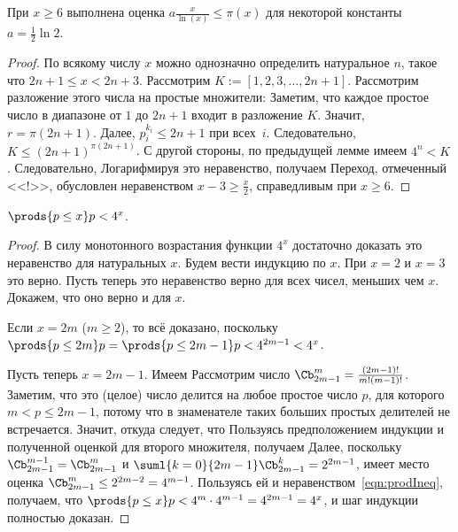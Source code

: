 \documentclass[a4paper]{article}
\begin{document}
\begin{theorem}\label{thm:lowerBoundary}
При $x \ge 6$ выполнена оценка $a\frac{x}{\ln(x)}\le\pi(x)$ для некоторой константы $a = \frac12\ln 2$.
\end{theorem}

\begin{proof}
По всякому числу $x$ можно однозначно определить натуральное $n$, такое что $2n+1\le x< 2n+3$.
Рассмотрим $K:=[1,2,3,\dots,2n+1]$. Рассмотрим разложение этого числа на простые множители:
Заметим, что каждое простое число в диапазоне от $1$ до $2n+1$ входит в разложение $K$. Значит, $r = \pi(2n+1)$.
Далее, $p_i^{k_i} \le 2n+1$ при всех~$i$. Следовательно,
$K\le(2n+1)^{\pi(2n+1)}$. С другой стороны, по предыдущей лемме имеем $4^n < K$.
Следовательно,
Логарифмируя это неравенство, получаем
Переход, отмеченный <<!>>, обусловлен неравенством $x-3\ge \frac{x}2$, справедливым при $x \ge 6$.
\end{proof}

\begin{lemma}
$\prods{p\le x}p<4^x$.
\end{lemma}
\begin{proof}
В силу монотонного возрастания функции $4^x$ достаточно доказать это неравенство для натуральных $x$.
Будем вести индукцию по $x$. При $x =2$ и $x=3$ это верно.
Пусть теперь это неравенство верно для всех чисел, меньших чем $x$. Докажем, что оно верно и для $x$.

Если $x = 2m$ ($m \ge 2$), то всё доказано, поскольку $\prods{p \le 2m}p = \prods{p \le 2m-1}p < 4^{2m-1} < 4^x$.

Пусть теперь $x = 2m-1$. Имеем
Рассмотрим число $\Cb_{2m-1}^m = \frac{(2m-1)!}{m!(m-1)!}$. Заметим, что это (целое) число делится на любое простое
число $p$, для которого $m < p \le 2m-1$, потому что в знаменателе таких больших простых делителей не встречается.
Значит,
откуда следует, что
Пользуясь предположением индукции и полученной оценкой для второго множителя, получаем
Далее, поскольку $\Cb_{2m-1}^{m-1}=\Cb_{2m-1}^m$ и
$\suml{k=0}{2m-1}\Cb_{2m-1}^k=2^{2m-1}$,
имеет место оценка $\Cb_{2m-1}^m\le 2^{2m-2} = 4^{m-1}$. Пользуясь ей и неравенством~\eqref{eqn:prodIneq},
получаем, что $\prods{p\le x}p< 4^m \cdot 4^{m-1} = 4^{2m-1}=4^x$, и шаг индукции полностью  доказан.
\end{proof}
\end{document}
